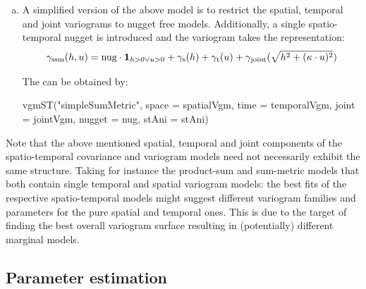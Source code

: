 \begin{enumerate}[a)]
\item
A simplified version of the above model is to restrict the spatial, temporal and joint variograms to nugget free models. Additionally, a single spatio-temporal nugget is introduced and the variogram takes the representation:
$$\gamma_{\rm ssm}(h,u) = {\rm nug}\cdot {\bf1}_{h>0 \vee u>0} + \gamma_{\rm s}(h) + \gamma_{\rm t}(u) + \gamma_{\rm joint}(\sqrt{h^2+(\kappa\cdot u)^2})$$

The  can be obtained by:

\begin{example*}
vgmST("simpleSumMetric", space = spatialVgm, time = temporalVgm,
      joint = jointVgm, nugget = nug, stAni = stAni)
\end{example*}
\end{enumerate}

\noindent Note that the above mentioned spatial, temporal and joint components of the spatio-temporal covariance and variogram models need not necessarily exhibit the same structure. Taking for instance the product-sum and sum-metric models that both contain single temporal and spatial variogram models: the best fits of the respective spatio-temporal models might suggest different variogram families and parameters for the pure spatial and temporal ones. This is due to the target of finding the best overall variogram surface resulting in (potentially) different marginal models.

\subsection{Parameter estimation}

